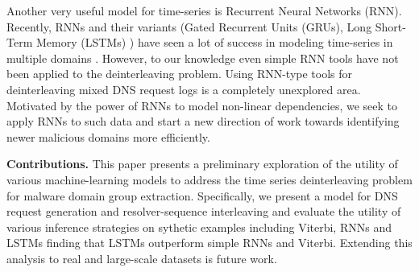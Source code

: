 	Another very useful model for time-series is Recurrent Neural Networks
	(RNN).  Recently, RNNs and their variants (Gated Recurrent Units
	(GRUs)\cite{chung2014empirical}, Long Short-Term Memory
	(LSTMs) \cite{Hochreiter}) have seen a lot of success in modeling
	time-series in multiple domains \cite{bahdanau2014neural,
		NIPS2008_3449, sutskever2014sequence}.  However, to our knowledge even
	simple RNN tools have not been applied to the deinterleaving
	problem. Using RNN-type tools for deinterleaving mixed DNS request
	logs is a completely unexplored area.  Motivated by the power of RNNs
	to model non-linear dependencies, we seek to apply RNNs to such data
	and start a new direction of work towards identifying newer malicious
	domains more efficiently.
	
	{\bf Contributions. } This paper presents a preliminary exploration of
	the utility of various machine-learning models to address the time
	series deinterleaving problem for malware domain group extraction.
	Specifically, we present a model for DNS request generation and
	resolver-sequence interleaving and evaluate the utility of various
	inference strategies on sythetic examples including Viterbi, RNNs and
	LSTMs finding that LSTMs outperform simple RNNs and Viterbi.  Extending
	this analysis to real and large-scale datasets is future work. 
